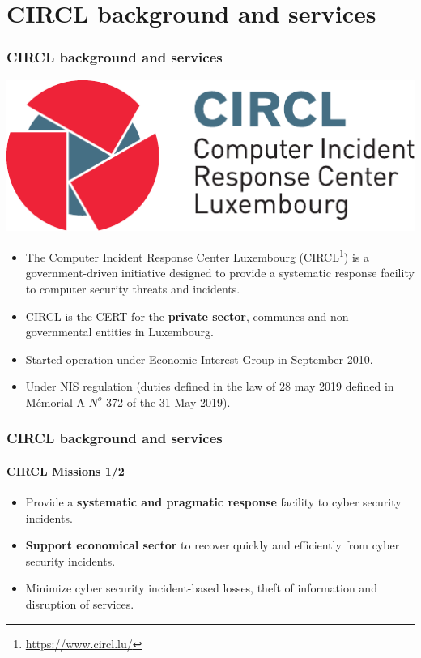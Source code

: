 \section{CIRCL background and services}
\begin{frame}
 	\frametitle{CIRCL background and services}
 \includegraphics[scale=0.5]{logo-circl.pdf}
 \begin{itemize}
     \item The Computer Incident Response Center Luxembourg (CIRCL\footnote{\url{https://www.circl.lu/}}) is a government-driven initiative designed to provide a systematic response facility to computer security threats and incidents.
 \item CIRCL is the CERT for the {\bf private sector}, communes and non-governmental entities in Luxembourg.
 \item Started operation under Economic Interest Group in September 2010.
 \item Under NIS regulation (duties defined in the law of 28 may 2019 defined in Mémorial A $N^{o}$ 372 of the 31 May 2019).
 \end{itemize}
\end{frame}

\begin{frame}
\frametitle{CIRCL background and services}
\framesubtitle{CIRCL Missions 1/2}
\begin{itemize}
\item Provide a {\bf systematic and pragmatic response} facility to cyber security incidents.
\item {\bf Support economical sector} to recover quickly and efficiently from cyber security incidents.
\item Minimize cyber security incident-based losses, theft of information and disruption of services.
\end{itemize}
\end{frame}

